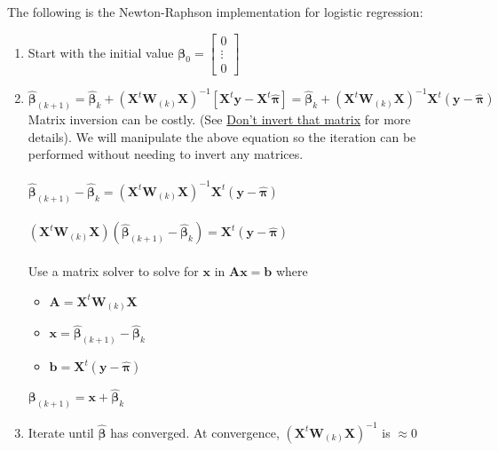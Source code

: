 \documentclass[12pt,timesnewroman,letterpaper]{article}
\begin{document}
\noindent The following is the Newton-Raphson implementation for logistic regression:
\begin{enumerate}
    \item Start with the initial value $\boldsymbol{\beta}_0 = \begin{bmatrix} 
    0 \\
    \vdots \\
    0
    \end{bmatrix}$
    \item $\boldsymbol{\hat{\beta}}_{(k+1)} = \boldsymbol{\hat{\beta}}_{k} + (\boldsymbol{X}^t \boldsymbol{W}_{(k)} \boldsymbol{X})^{-1}[\boldsymbol{X}^t\boldsymbol{y} - \boldsymbol{X}^t\boldsymbol{\hat{\pi}}] = \boldsymbol{\hat{\beta}}_{k} + (\boldsymbol{X}^t \boldsymbol{W}_{(k)} \boldsymbol{X})^{-1}\boldsymbol{X}^t(\boldsymbol{y - \hat{\pi}})$
    \\
    Matrix inversion can be costly. (See \href{https://www.johndcook.com/blog/2010/01/19/dont-invert-that-matrix/}{Don't invert that matrix} for more details). We will manipulate the above equation so the iteration can be performed without needing to invert any matrices.
    \\\\
    $\boldsymbol{\hat{\beta}}_{(k+1)} - \boldsymbol{\hat{\beta}}_{k} = (\boldsymbol{X}^t \boldsymbol{W}_{(k)} \boldsymbol{X})^{-1}\boldsymbol{X}^t(\boldsymbol{y - \hat{\pi}})$
    \\\\
    $(\boldsymbol{X}^t \boldsymbol{W}_{(k)} \boldsymbol{X})(\boldsymbol{\hat{\beta}}_{(k+1)} - \boldsymbol{\hat{\beta}}_{k}) = \boldsymbol{X}^t(\boldsymbol{y - \hat{\pi}})$
    \\\\
    Use a matrix solver to solve for $\boldsymbol{x}$ in $\boldsymbol{Ax} = \boldsymbol{b}$ where 
    \begin{itemize}
    \item $\boldsymbol{A} = \boldsymbol{X}^t \boldsymbol{W}_{(k)} \boldsymbol{X}$
    \item $\boldsymbol{x} = \boldsymbol{\hat{\beta}}_{(k+1)} - \boldsymbol{\hat{\beta}}_{k}$
    \item $\boldsymbol{b} = \boldsymbol{X}^t(\boldsymbol{y - \hat{\pi}})$
    \end{itemize}
    
    $\boldsymbol{\beta}_{(k+1)} = \boldsymbol{x} + \boldsymbol{\hat{\beta}}_{k}$
    
    \item Iterate until $\boldsymbol{\hat{\beta}}$ has converged. At convergence, $(\boldsymbol{X}^t \boldsymbol{W}_{(k)} \boldsymbol{X})^{-1}$ is $\approx 0$
\end{enumerate}
\end{document}
